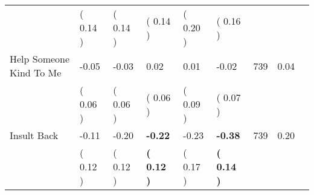 \begin{tabular}{L{6.2cm} C{1.8cm} C{1.8cm} C{1.8cm} C{1.8cm} C{1.8cm} C{1.8cm} C{0.3cm} C{0.3cm}}
 & (     0.14 ) & (     0.14 ) & (     0.14 ) & (     0.20 ) & (     0.16 )  & \\
Help Someone Kind To Me &     -0.05 &     -0.03 &      0.02 &      0.01 &     -0.02  & 739 &       0.04 \\ 
 & (     0.06 ) & (     0.06 ) & (     0.06 ) & (     0.09 ) & (     0.07 )  & \\
Insult Back &     -0.11 &     -0.20 & \textbf{    -0.22} &     -0.23 & \textbf{    -0.38}  & 739 &       0.20 \\ 
 & (     0.12 ) & (     0.12 ) & \textbf{(     0.12 )} & (     0.17 ) & \textbf{(     0.14 )}  & \\
\bottomrule
\end{tabular}
